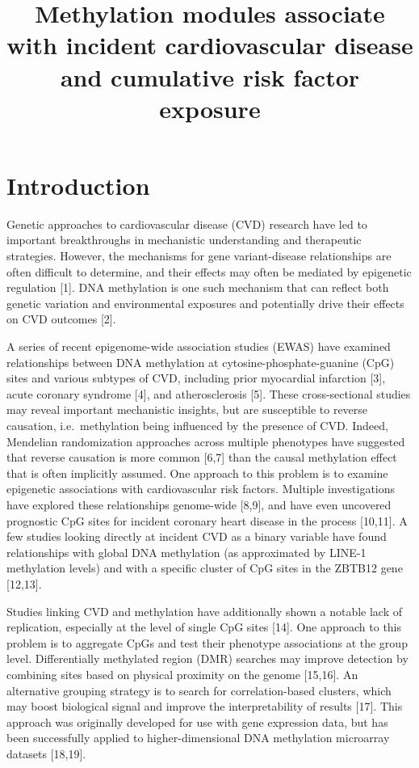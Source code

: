 \documentclass[]{article}
\title{Methylation modules associate with incident cardiovascular disease and
cumulative risk factor exposure}
\author{}
\date{}
\theoremstyle{definition}
\theoremstyle{definition}
\theoremstyle{definition}
\theoremstyle{remark}
\begin{document}
\maketitle


\section{Introduction}\label{introduction}

Genetic approaches to cardiovascular disease (CVD) research have led to
important breakthroughs in mechanistic understanding and therapeutic
strategies. However, the mechanisms for gene variant-disease
relationships are often difficult to determine, and their effects may
often be mediated by epigenetic regulation {[}1{]}. DNA methylation is
one such mechanism that can reflect both genetic variation and
environmental exposures and potentially drive their effects on CVD
outcomes {[}2{]}.

A series of recent epigenome-wide association studies (EWAS) have
examined relationships between DNA methylation at
cytosine-phosphate-guanine (CpG) sites and various subtypes of CVD,
including prior myocardial infarction {[}3{]}, acute coronary syndrome
{[}4{]}, and atherosclerosis {[}5{]}. These cross-sectional studies may
reveal important mechanistic insights, but are susceptible to reverse
causation, i.e.~methylation being influenced by the presence of CVD.
Indeed, Mendelian randomization approaches across multiple phenotypes
have suggested that reverse causation is more common {[}6,7{]} than the
causal methylation effect that is often implicitly assumed. One approach
to this problem is to examine epigenetic associations with
cardiovascular risk factors. Multiple investigations have explored these
relationships genome-wide {[}8,9{]}, and have even uncovered prognostic
CpG sites for incident coronary heart disease in the process
{[}10,11{]}. A few studies looking directly at incident CVD as a binary
variable have found relationships with global DNA methylation (as
approximated by LINE-1 methylation levels) and with a specific cluster
of CpG sites in the ZBTB12 gene {[}12,13{]}.

Studies linking CVD and methylation have additionally shown a notable
lack of replication, especially at the level of single CpG sites
{[}14{]}. One approach to this problem is to aggregate CpGs and test
their phenotype associations at the group level. Differentially
methylated region (DMR) searches may improve detection by combining
sites based on physical proximity on the genome {[}15,16{]}. An
alternative grouping strategy is to search for correlation-based
clusters, which may boost biological signal and improve the
interpretability of results {[}17{]}. This approach was originally
developed for use with gene expression data, but has been successfully
applied to higher-dimensional DNA methylation microarray datasets
{[}18,19{]}.
\end{document}
